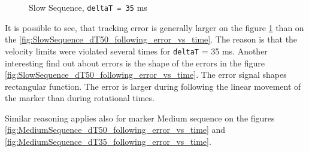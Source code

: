\documentclass[]{scrartcl}
\begin{document}
\begin{figure}[!htp]
	\hfill
	\caption{Slow Sequence, \texttt{deltaT = 35} ms}
	\label{fig:SlowSequence_dT35_following_error_vs_time}
\end{figure}
It is possible to see, that tracking error is generally larger on the figure \ref{fig:SlowSequence_dT35_following_error_vs_time} than on the \ref{fig:SlowSequence_dT50_following_error_vs_time}. The reason is that the velocity limits were violated several times for \texttt{deltaT} = 35 ms. Another interesting find out about errors is the shape of the errors in the figure \ref{fig:SlowSequence_dT50_following_error_vs_time}. The error signal shapes rectangular function. The error is larger during following the linear movement of the marker than during rotational times.

Similar reasoning applies also for marker Medium sequence on the figures \ref{fig:MediumSequence_dT50_following_error_vs_time} and \ref{fig:MediumSequence_dT35_following_error_vs_time}.
\end{document}
